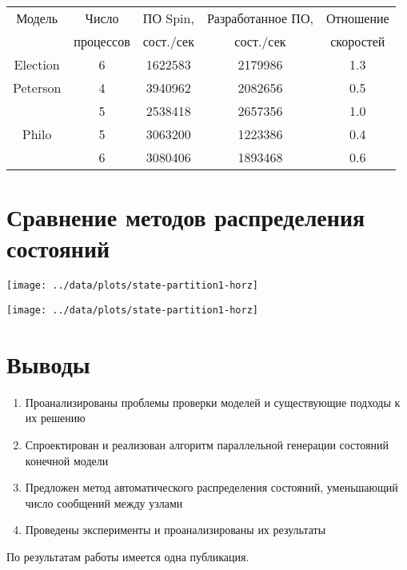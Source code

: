\documentclass[12pt]{article}
\begin{document}
\begin{tabular}{ccccc}
  \hline
  Модель & Число     & ПО Spin,   & Разработанное ПО, & Отношение \\
  & процессов & сост./сек &  сост./сек         & скоростей \\
  \hline
  Election & 6 & 1622583 & 2179986 & 1.3 \\
  Peterson & 4 & 3940962 & 2082656 & 0.5 \\
   & 5 & 2538418 & 2657356 & 1.0 \\
  Philo & 5 & 3063200 & 1223386 & 0.4 \\
   & 6 & 3080406 & 1893468 & 0.6 \\
  \hline
\end{tabular}

\section{Сравнение методов распределения состояний}
\label{sec:partition-cmp}

\begin{minipage}[m]{0.5\linewidth}
  \texttt{[image: ../data/plots/state-partition1-horz]}  
\end{minipage}
\begin{minipage}[m]{0.5\linewidth}
  \texttt{[image: ../data/plots/state-partition1-horz]}  
\end{minipage}

\section{Выводы}
\label{sec:conclusion}

\small
\begin{enumerate}
\item Проанализированы проблемы проверки моделей и существующие подходы к их решению
\item Спроектирован и реализован алгоритм параллельной генерации состояний конечной
  модели
\item Предложен метод автоматического распределения состояний, уменьшающий число сообщений
  между узлами
\item Проведены эксперименты и проанализированы их результаты
\end{enumerate}

По результатам работы имеется одна публикация.
\end{document}
